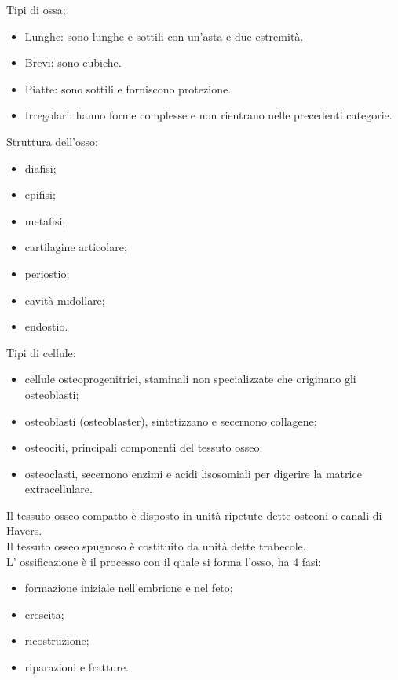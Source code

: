 \documentclass[a4paper]{article}
\begin{document}
Tipi di ossa;
\begin{itemize}
\item Lunghe: sono lunghe e sottili con un’asta e due estremità.
\item Brevi: sono cubiche.
\item Piatte: sono sottili e forniscono protezione.
\item Irregolari: hanno forme complesse e non rientrano nelle precedenti categorie.
\end{itemize}

Struttura dell'osso:
\begin{itemize}
\item diafisi;
\item epifisi;
\item metafisi;
\item cartilagine articolare;
\item periostio;
\item cavità midollare;
\item endostio.
\end{itemize}

Tipi di cellule:
\begin{itemize}
\item cellule osteoprogenitrici, staminali non specializzate che originano gli osteoblasti;
\item osteoblasti (osteoblaster), sintetizzano e secernono collagene;
\item osteociti, principali componenti del tessuto osseo;
\item osteoclasti, secernono enzimi e acidi lisosomiali per digerire la matrice extracellulare.
\end{itemize}

Il tessuto osseo compatto è disposto in unità ripetute dette osteoni o canali di Havers. \\
Il tessuto osseo spugnoso è costituito da unità dette trabecole. \\
L’ ossificazione è il processo con il quale si forma l’osso, ha 4 fasi:
\begin{itemize}
    \item formazione iniziale nell’embrione e nel feto;
    \item crescita;
    \item ricostruzione;
    \item riparazioni e fratture.
\end{itemize}
\end{document}
